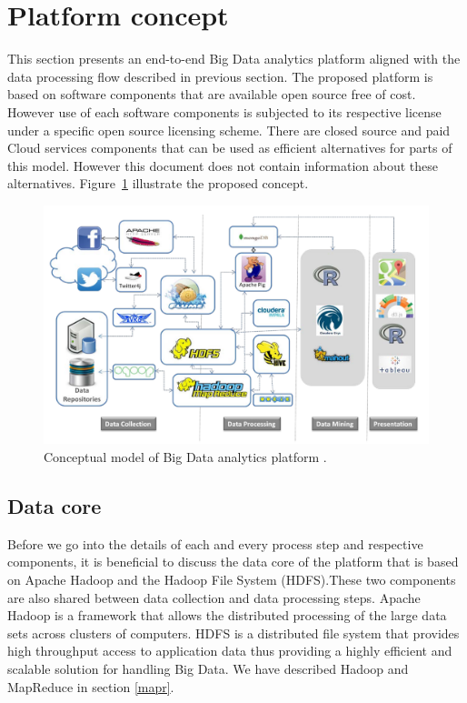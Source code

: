  \section{Platform concept}
 This section presents an end-to-end Big Data analytics platform aligned with the data processing flow described in previous section. The proposed platform is based on software components that are available open source free of cost. However use of each software components is subjected to its respective license under a specific open source licensing scheme. There are closed source and paid Cloud services components that can be used as efficient alternatives for parts of this model. However this document does not contain information about these alternatives. Figure~\ref{fig:cplatform} illustrate the proposed concept.
 \begin{figure}[!h]
    \begin{center}
      \includegraphics[width=\textwidth]{images/cplatform.pdf}
      \caption{Conceptual model of Big Data analytics platform .}
      \label{fig:cplatform}
    \end{center}
  \end{figure} 
\subsection{Data core}
Before we go into the details of each and every process step and respective components, it is beneficial to discuss the data core of the platform that is based on Apache Hadoop and the Hadoop File System (HDFS).These two components are also shared between data collection and data processing steps.  Apache Hadoop is a framework that allows the distributed processing of the large data sets across clusters of computers. HDFS is a distributed file system that provides high throughput access to application data\cite{apachehadoop} thus providing a highly efficient and scalable solution for handling Big Data. We have described Hadoop and MapReduce in section \ref{mapr}.
